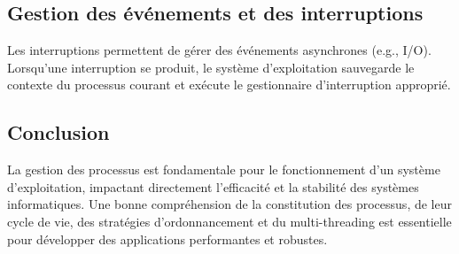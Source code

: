 \subsection{Gestion des événements et des interruptions}
Les interruptions permettent de gérer des événements asynchrones (e.g., I/O). 
Lorsqu'une interruption se produit, le système d'exploitation sauvegarde le contexte du processus courant et exécute le gestionnaire d'interruption approprié.

\subsection{Conclusion}
La gestion des processus est fondamentale pour le fonctionnement d'un système d'exploitation, impactant directement l'efficacité et la stabilité des systèmes informatiques. 
Une bonne compréhension de la constitution des processus, de leur cycle de vie, des stratégies d'ordonnancement et du multi-threading est essentielle pour développer des applications performantes et robustes.
